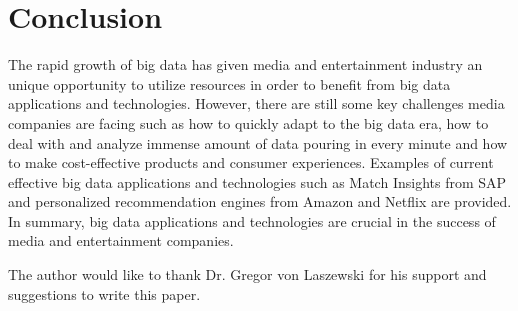\documentclass[sigconf]{acmart}
\begin{document}
\section{Conclusion}

The rapid growth of big data has given media and entertainment industry an unique opportunity to utilize resources in order to benefit from big data applications and technologies. However, there are still some key challenges media companies are facing such as how to quickly adapt to the big data era, how to deal with and analyze immense amount of data pouring in every minute and how to make cost-effective products and consumer experiences. Examples of current effective big data applications and technologies such as Match Insights from SAP and personalized recommendation engines from Amazon and Netflix are provided. In summary, big data applications and technologies are crucial in the success of media and entertainment companies. 

\begin{acks}

  The author would like to thank Dr. Gregor von Laszewski for his support and suggestions to write this paper.

\end{acks}


 
\end{document}
